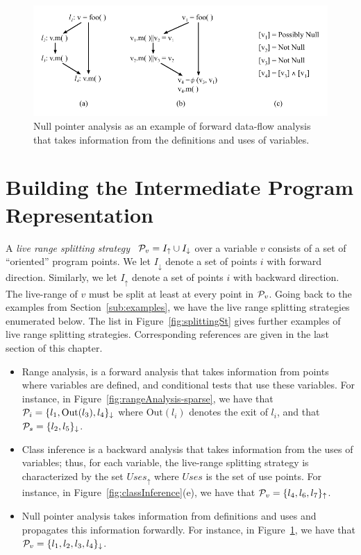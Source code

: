 \begin{figure}[t!]
\centering
\includegraphics[width=\linewidth]{nullAnalysis}
\caption{Null pointer analysis as an example of forward data-flow analysis that takes information from the definitions and uses of variables.} \label{fig:nullAnalysis}
\end{figure}


\section{Building the Intermediate Program Representation}
\label{sec:building}
\def\Sdown{\downarrow}
\def\Sup{\uparrow}
\def\SS{{\cal P}}
\def\Out{\mathrm{Out}}
\def\In{\mathrm{In}}
\def\Defs{\mathrm{Defs}}
\def\Def{\mathrm{Def}}
\def\Uses{\mathrm{Uses}}

A {\em live range splitting strategy} \
$\SS_v = I_\uparrow \cup I_\downarrow$ over a variable $v$ consists of a set
of ``oriented'' program points.
We let $I_\downarrow$ denote a set of points $i$ with forward direction.
Similarly, we let $I_\uparrow$ denote a set of points $i$ with backward
direction.
The live-range of $v$ must be split at least at every point in $\SS_v$.
Going back to the examples from Section~\ref{sub:examples}, we have the live range splitting strategies enumerated below.
The list in Figure~\ref{fig:splittingSt} gives further examples of live range splitting strategies. Corresponding references are given in the last section of this chapter.

\begin{itemize}
\item Range analysis, is a forward analysis that takes information from points where variables are defined, and conditional tests that use these variables.
For instance, in Figure~\ref{fig:rangeAnalysis-sparse}, we have that $\SS_{i} = \{l_1, \Out(l_3), l_4\}_\downarrow$ where $\Out(l_i)$ denotes the exit of $l_i$, and that $\SS_{s}=\{l_2, l_5\}_\downarrow$.

\item Class inference is a backward analysis that takes information from the uses of variables; thus, for each variable, the live-range splitting strategy is characterized by the set $\mathit{Uses}_\uparrow$ where $\mathit{Uses}$ is the set of use points.
For instance, in Figure~\ref{fig:classInference}(e), we have that
$\SS_{v} = \{l_4, l_6,l_7\}_\uparrow$.


\item Null pointer analysis takes information from definitions and uses and propagates this information forwardly.
For instance, in Figure~\ref{fig:nullAnalysis}, we have that
$\SS_{v} = \{l_1, l_2, l_3, l_4\}_\downarrow$.
\end{itemize}

